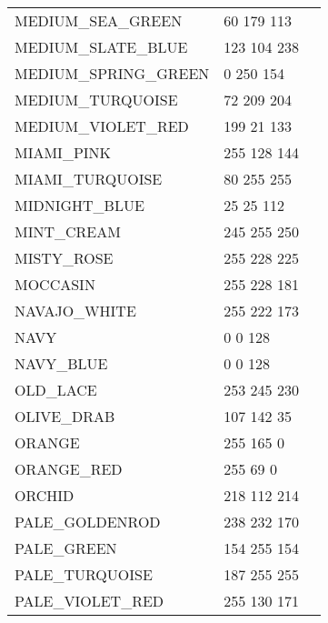 \begin{longtable}{l|l|l}
MEDIUM\_SEA\_GREEN & 60 179 113 & \colorbox[RGB]{60 179 113}{\phantom{MMMMMMMM}}\\
MEDIUM\_SLATE\_BLUE & 123 104 238 & \colorbox[RGB]{123 104 238}{\phantom{MMMMMMMM}}\\
MEDIUM\_SPRING\_GREEN & 0 250 154 & \colorbox[RGB]{0 250 154}{\phantom{MMMMMMMM}}\\
MEDIUM\_TURQUOISE & 72 209 204 & \colorbox[RGB]{72 209 204}{\phantom{MMMMMMMM}}\\
MEDIUM\_VIOLET\_RED & 199 21 133 & \colorbox[RGB]{199 21 133}{\phantom{MMMMMMMM}}\\
MIAMI\_PINK & 255 128 144 & \colorbox[RGB]{255 128 144}{\phantom{MMMMMMMM}}\\
MIAMI\_TURQUOISE & 80 255 255 & \colorbox[RGB]{80 255 255}{\phantom{MMMMMMMM}}\\
MIDNIGHT\_BLUE & 25 25 112 & \colorbox[RGB]{25 25 112}{\phantom{MMMMMMMM}}\\
MINT\_CREAM & 245 255 250 & \colorbox[RGB]{245 255 250}{\phantom{MMMMMMMM}}\\
MISTY\_ROSE & 255 228 225 & \colorbox[RGB]{255 228 225}{\phantom{MMMMMMMM}}\\
MOCCASIN & 255 228 181 & \colorbox[RGB]{255 228 181}{\phantom{MMMMMMMM}}\\
NAVAJO\_WHITE & 255 222 173 & \colorbox[RGB]{255 222 173}{\phantom{MMMMMMMM}}\\
NAVY & 0 0 128 & \colorbox[RGB]{0 0 128}{\phantom{MMMMMMMM}}\\
NAVY\_BLUE & 0 0 128 & \colorbox[RGB]{0 0 128}{\phantom{MMMMMMMM}}\\
OLD\_LACE & 253 245 230 & \colorbox[RGB]{253 245 230}{\phantom{MMMMMMMM}}\\
OLIVE\_DRAB & 107 142 35 & \colorbox[RGB]{107 142 35}{\phantom{MMMMMMMM}}\\
ORANGE & 255 165 0 & \colorbox[RGB]{255 165 0}{\phantom{MMMMMMMM}}\\
ORANGE\_RED & 255 69 0 & \colorbox[RGB]{255 69 0}{\phantom{MMMMMMMM}}\\
ORCHID & 218 112 214 & \colorbox[RGB]{218 112 214}{\phantom{MMMMMMMM}}\\
PALE\_GOLDENROD & 238 232 170 & \colorbox[RGB]{238 232 170}{\phantom{MMMMMMMM}}\\
PALE\_GREEN & 154 255 154 & \colorbox[RGB]{154 255 154}{\phantom{MMMMMMMM}}\\
PALE\_TURQUOISE & 187 255 255 & \colorbox[RGB]{187 255 255}{\phantom{MMMMMMMM}}\\
PALE\_VIOLET\_RED & 255 130 171 & \colorbox[RGB]{255 130 171}{\phantom{MMMMMMMM}}\\

\end{longtable}
